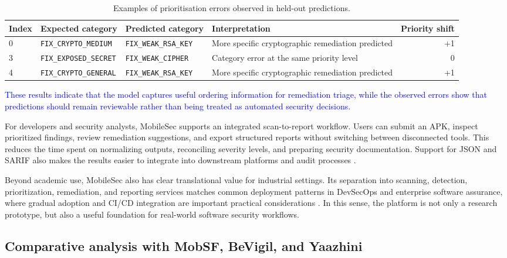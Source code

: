 \documentclass[preprint,12pt, a4paper]{elsarticle}
\begin{document}
{\begin{table}[!htbp]
\centering
\caption{Examples of prioritisation errors observed in held-out predictions.}
\label{tab:lightgbm-errors}
\begin{tabular}{llllr}
\toprule
\textbf{Index} & \textbf{Expected category} & \textbf{Predicted category} & \textbf{Interpretation} & \textbf{Priority shift} \\
\midrule
0 & \texttt{FIX\_CRYPTO\_MEDIUM} & \texttt{FIX\_WEAK\_RSA\_KEY} & More specific cryptographic remediation predicted & +1 \\
3 & \texttt{FIX\_EXPOSED\_SECRET} & \texttt{FIX\_WEAK\_CIPHER} & Category error at the same priority level & 0 \\
4 & \texttt{FIX\_CRYPTO\_GENERAL} & \texttt{FIX\_WEAK\_RSA\_KEY} & More specific cryptographic remediation predicted & +1 \\
\bottomrule
\end{tabular}
\end{table}
}

\textcolor{blue}{These results indicate that the model captures useful ordering information for remediation triage, while the observed errors show that predictions should remain reviewable rather than being treated as automated security decisions.}

For developers and security analysts, MobileSec supports an integrated scan-to-report workflow. Users can submit an APK, inspect prioritized findings, review remediation suggestions, and export structured reports without switching between disconnected tools. This reduces the time spent on normalizing outputs, reconciling severity levels, and preparing security documentation. Support for JSON and SARIF also makes the results easier to integrate into downstream platforms and audit processes \cite{sarif2020}.

Beyond academic use, MobileSec also has clear translational value for industrial settings. Its separation into scanning, detection, prioritization, remediation, and reporting services matches common deployment patterns in DevSecOps and enterprise software assurance, where gradual adoption and CI/CD integration are important practical considerations \cite{zhao2024devsecops,prates2025devsecops,mothanna2024security}. In this sense, the platform is not only a research prototype, but also a useful foundation for real-world software security workflows.

\subsection{Comparative analysis with MobSF, BeVigil, and Yaazhini}
\end{document}
